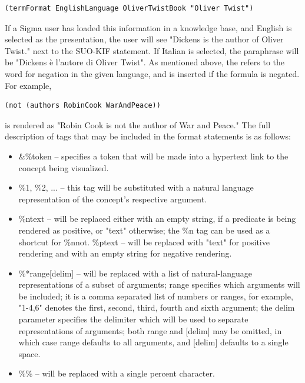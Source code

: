 \documentclass{book}
\begin{document}
\begin{verbatim}
(termFormat EnglishLanguage OliverTwistBook "Oliver Twist")
\end{verbatim}

If a Sigma user has loaded this information in a knowledge base, and English is
selected as the presentation, the user will see "Dickens is the author of Oliver
Twist." next to the SUO-KIF statement.  If Italian is selected, the paraphrase
will be "Dickens è l'autore di Oliver Twist".  As mentioned above, the %
refers to the word for negation in the given language, and is inserted if the
formula is negated.  For example,

\begin{verbatim}
(not (authors RobinCook WarAndPeace))
\end{verbatim}

is rendered as "Robin Cook is not the author of War and Peace." The full
description of tags that may be included in the format statements is as follows:

\begin{itemize}

\item \&\%token – specifies a token that will be made into a hypertext link to
the concept being visualized.

\item \%1, \%2, ... – this tag will be substituted with a natural language
representation of the concept’s respective argument.

\item \%n{text} – will be replaced either with an empty string, if a predicate
is being rendered as positive, or "text" otherwise; the \%n tag can be used as a
shortcut for \%n{not}. \%p{text} – will be replaced with "text" for positive
rendering and with an empty string for negative rendering.

\item \%*{range}[delim] – will be replaced with a list of natural-language
representations of a subset of arguments; range specifies which arguments will
be included; it is a comma separated list of numbers or ranges, for example,
"1-4,6" denotes the first, second, third, fourth and sixth argument; the
delim parameter specifies the delimiter which will be used to separate
representations of arguments; both {range} and [delim] may be omitted, in which
case {range} defaults to all arguments, and [delim] defaults to a single space.

\item \%\% – will be replaced with a single percent character.
\end{itemize}
\end{document}
